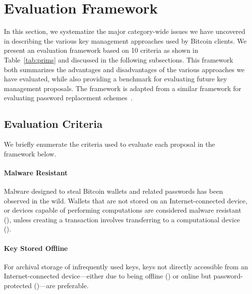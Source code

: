 \section{Evaluation Framework}
In this section, we systematize the major category-wide issues we have uncovered in describing the various key management approaches used by Bitcoin clients. We present an evaluation framework based on 10 criteria as shown in Table~\ref{tab:prims} and discussed in the following subsections. This framework both summarizes the advantages and disadvantages of the various approaches we have evaluated, while also providing a benchmark for evaluating future key management proposals. The framework is adapted from a similar framework for evaluating password replacement schemes~\cite{BHOS12}.

\subsection{Evaluation Criteria}
We briefly enumerate the criteria used to evaluate each proposal in the framework below. 

\paragraph{Malware Resistant}
\label{Malware Resistant}
Malware designed to steal Bitcoin wallets and related passwords has been observed in the wild. Wallets that are not stored on an Internet-connected device, or devices capable of performing computations are considered malware resistant (\full), unless creating a transaction involves transferring to a computational device (\prt). 

\paragraph{Key Stored Offline}
\label{Key Kept Offline}
For archival storage of infrequently used keys, keys not directly accessible from an Internet-connected device---either due to being offline (\full) or online but password-protected (\prt)---are preferable. 

